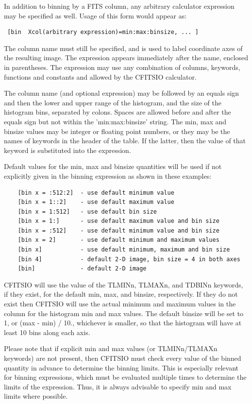\documentclass[11pt]{book}
\begin{document}
In addition to binning by a FITS column, any arbitrary calculator
expression may be specified as well.  Usage of this form would appear
as:

\begin{verbatim}
 [bin  Xcol(arbitrary expression)=min:max:binsize, ... ]
\end{verbatim}

The column name must still be specified, and is used to label
coordinate axes of the resulting image.  The expression appears
immediately after the name, enclosed in parentheses.  The expression
may use any combination of columns, keywords, functions and constants
and allowed by the CFITSIO calculator.

The column name (and optional expression) may be followed by an equals
sign and then the lower and upper range of the histogram, and the size
of the histogram bins, separated by colons.  Spaces are allowed before
and after the equals sign but not within the 'min:max:binsize' string.
The min, max and binsize values may be integer or floating point
numbers, or they may be the names of keywords in the header of the
table.  If the latter, then the value of that keyword is substituted
into the expression.

Default values for the min, max and binsize quantities will be
used if not explicitly given in the binning expression as shown
in these examples:

\begin{verbatim}
    [bin x = :512:2]  - use default minimum value
    [bin x = 1::2]    - use default maximum value
    [bin x = 1:512]   - use default bin size
    [bin x = 1:]      - use default maximum value and bin size
    [bin x = :512]    - use default minimum value and bin size
    [bin x = 2]       - use default minimum and maximum values
    [bin x]           - use default minimum, maximum and bin size
    [bin 4]           - default 2-D image, bin size = 4 in both axes
    [bin]             - default 2-D image
\end{verbatim}
CFITSIO  will use the value of the TLMINn, TLMAXn, and TDBINn keywords,
if they exist, for the default min, max, and binsize, respectively.  If
they do not exist then CFITSIO will use the actual minimum and maximum
values in the column for the histogram min and max values.  The default
binsize will be set to 1, or (max - min) / 10., whichever is smaller,
so that the histogram will have at least 10 bins along each axis.

Please note that if explicit min and max values (or TLMINn/TLMAXn keywords)
are not present, then CFITSIO must check every value of the binned quantity
in advance to determine the binning limits.  This is especially relevant
for binning expressions, which must be evaluated multiple times to determine
the limits of the expression.  Thus, it is always advisable to specify
min and max limits where possible.
\end{document}
